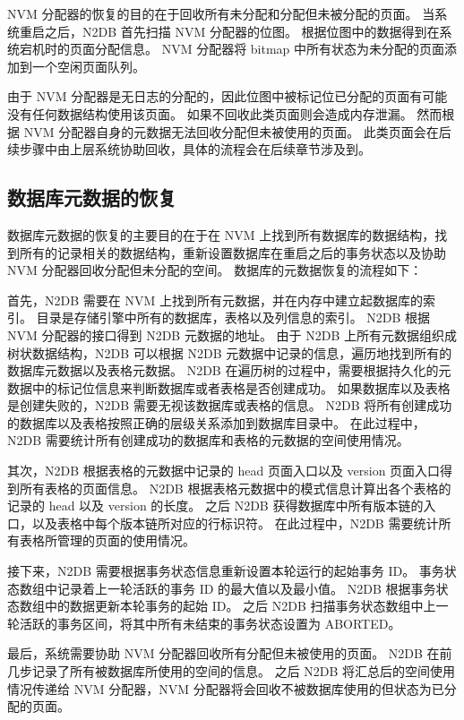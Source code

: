 NVM 分配器的恢复的目的在于回收所有未分配和分配但未被分配的页面。
当系统重启之后，N2DB 首先扫描 NVM 分配器的位图。
根据位图中的数据得到在系统宕机时的页面分配信息。
NVM 分配器将 bitmap 中所有状态为未分配的页面添加到一个空闲页面队列。

由于 NVM 分配器是无日志的分配的，因此位图中被标记位已分配的页面有可能没有任何数据结构使用该页面。
如果不回收此类页面则会造成内存泄漏。
然而根据 NVM 分配器自身的元数据无法回收分配但未被使用的页面。
此类页面会在后续步骤中由上层系统协助回收，具体的流程会在后续章节涉及到。

\subsection{数据库元数据的恢复}
\label{ssec:metadata-recovery}

数据库元数据的恢复的主要目的在于在 NVM 上找到所有数据库的数据结构，找到所有的记录相关的数据结构，重新设置数据库在重启之后的事务状态以及协助 NVM 分配器回收分配但未分配的空间。
数据库的元数据恢复的流程如下：

首先，N2DB 需要在 NVM 上找到所有元数据，并在内存中建立起数据库的索引。
目录是存储引擎中所有的数据库，表格以及列信息的索引。
N2DB 根据 NVM 分配器的接口得到 N2DB 元数据的地址。
由于 N2DB 上所有元数据组织成树状数据结构，N2DB 可以根据 N2DB 元数据中记录的信息，遍历地找到所有的数据库元数据以及表格元数据。
N2DB 在遍历树的过程中，需要根据持久化的元数据中的标记位信息来判断数据库或者表格是否创建成功。
如果数据库以及表格是创建失败的，N2DB 需要无视该数据库或表格的信息。
N2DB 将所有创建成功的数据库以及表格按照正确的层级关系添加到数据库目录中。
在此过程中，N2DB 需要统计所有创建成功的数据库和表格的元数据的空间使用情况。

其次，N2DB 根据表格的元数据中记录的 head 页面入口以及 version 页面入口得到所有表格的页面信息。
N2DB 根据表格元数据中的模式信息计算出各个表格的记录的 head 以及 version 的长度。
之后 N2DB 获得数据库中所有版本链的入口，以及表格中每个版本链所对应的行标识符。
在此过程中，N2DB 需要统计所有表格所管理的页面的使用情况。

接下来，N2DB 需要根据事务状态信息重新设置本轮运行的起始事务 ID。
事务状态数组中记录着上一轮活跃的事务 ID 的最大值以及最小值。
N2DB 根据事务状态数组中的数据更新本轮事务的起始 ID。
之后 N2DB 扫描事务状态数组中上一轮活跃的事务区间，将其中所有未结束的事务状态设置为 ABORTED。

最后，系统需要协助 NVM 分配器回收所有分配但未被使用的页面。
N2DB 在前几步记录了所有被数据库所使用的空间的信息。
之后 N2DB 将汇总后的空间使用情况传递给 NVM 分配器，NVM 分配器将会回收不被数据库使用的但状态为已分配的页面。



